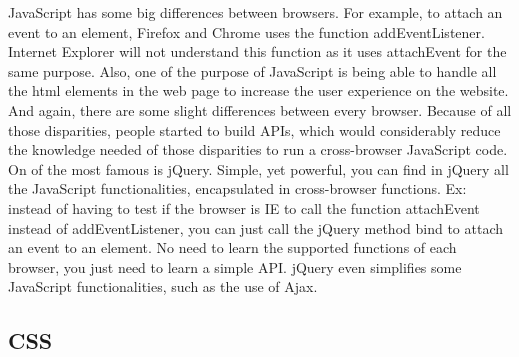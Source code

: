 JavaScript has some big differences between browsers. For example, to attach an event to an element, Firefox and Chrome uses the function addEventListener. Internet Explorer will not understand this function as it uses attachEvent for the same purpose. %
Also, one of the purpose of JavaScript is being able to handle all the html elements in the web page to increase the user experience on the website. And again, there are some slight differences between every browser.
Because of all those disparities, people started to build APIs, which would considerably reduce the knowledge needed of those disparities to run a cross-browser JavaScript code. On of the most famous is jQuery. Simple, yet powerful, you can find in jQuery all the JavaScript functionalities, encapsulated in cross-browser functions. Ex: instead of having to test if the browser is IE to call the function attachEvent instead of addEventListener, you can just call the jQuery method bind to attach an event to an element. No need to learn the supported functions of each browser, you just need to learn a simple API. jQuery even simplifies some JavaScript functionalities, such as the use of Ajax.

\subsection{CSS}

